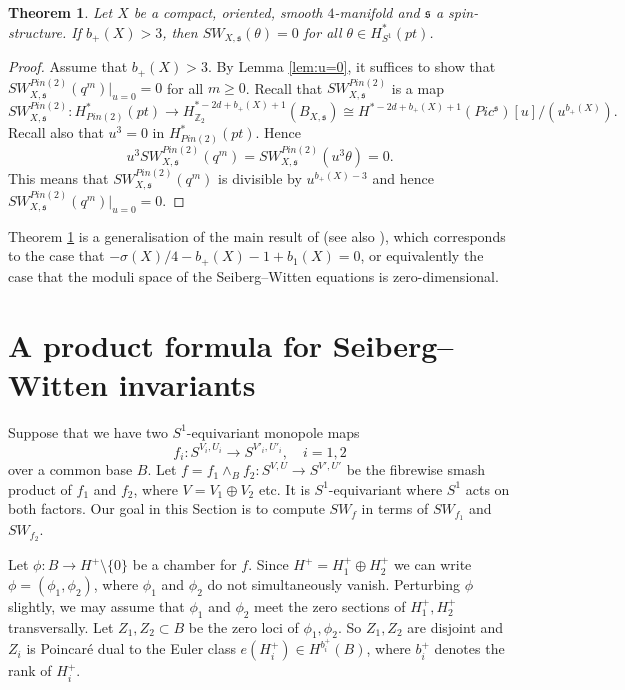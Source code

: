 \documentclass{amsart}
\newtheorem{theorem}{Theorem}[section]
\theoremstyle{definition}
\theoremstyle{remark}
\numberwithin{equation}{section}
\begin{document}
\begin{theorem}\label{thm:vanb+}
Let $X$ be a compact, oriented, smooth $4$-manifold and $\mathfrak{s}$ a spin-structure. If $b_+(X) > 3$, then $SW_{X,\mathfrak{s}}(\theta) = 0$ for all $\theta \in H^*_{S^1}(pt)$.
\end{theorem}
\begin{proof}
Assume that $b_+(X)>3$. By Lemma \ref{lem:u=0}, it suffices to show that \linebreak $SW^{Pin(2)}_{X,\mathfrak{s}}(q^m)|_{u=0} = 0$ for all $m \ge 0$. Recall that $SW^{Pin(2)}_{X , \mathfrak{s}}$ is a map 
\[
SW^{Pin(2)}_{X,\mathfrak{s}} : H^*_{Pin(2)}(pt) \to H^{*-2d+b_+(X)+1}_{\mathbb{Z}_2}( B_{X,\mathfrak{s}}) \cong H^{*-2d+b_+(X)+1}( Pic^{\mathfrak{s}})[u]/(u^{b_+(X)}).
\]
Recall also that $u^3 = 0$ in $H^*_{Pin(2)}(pt)$. Hence 
\[
u^3 SW^{Pin(2)}_{X,\mathfrak{s}}(q^m) = SW^{Pin(2)}_{X,\mathfrak{s}}(u^3 \theta ) = 0.
\]
This means that $SW^{Pin(2)}_{X , \mathfrak{s}}(q^m)$ is divisible by $u^{b_+(X)-3}$ and hence $SW^{Pin(2)}_{X , \mathfrak{s}}(q^m)|_{u=0} = 0$.
\end{proof}

Theorem \ref{thm:vanb+} is a generalisation of the main result of \cite{bau} (see also \cite{li}), which corresponds to the case that $-\sigma(X)/4-b_+(X)-1+b_1(X) = 0$, or equivalently the case that the moduli space of the Seiberg--Witten equations is zero-dimensional.



\section{A product formula for Seiberg--Witten invariants}\label{sec:prod}

Suppose that we have two $S^1$-equivariant monopole maps
\[
f_i : S^{V_i,U_i} \to S^{V'_i,U'_i}, \quad i=1,2
\]
over a common base $B$. Let $f = f_1 \wedge_B f_2 : S^{V,U} \to S^{V',U'}$ be the fibrewise smash product of $f_1$ and $f_2$, where $V = V_1 \oplus V_2$ etc. It is $S^1$-equivariant where $S^1$ acts on both factors. Our goal in this Section is to compute $SW_f$ in terms of $SW_{f_1}$ and $SW_{f_2}$.

Let $\phi : B \to H^+ \setminus \{0\}$ be a chamber for $f$. Since $H^+ = H^+_1 \oplus H^+_2$ we can write $\phi = (\phi_1 , \phi_2)$, where $\phi_1$ and $\phi_2$ do not simultaneously vanish. Perturbing $\phi$ slightly, we may assume that $\phi_1$ and $\phi_2$ meet the zero sections of $H^+_1, H^+_2$ transversally. Let $Z_1,Z_2 \subset B$ be the zero loci of $\phi_1, \phi_2$. So $Z_1, Z_2$ are disjoint and $Z_i$ is Poincar\'e dual to the Euler class $e(H^+_i) \in H^{b^+_i}(B)$, where $b^+_i$ denotes the rank of $H^+_i$.
\end{document}
